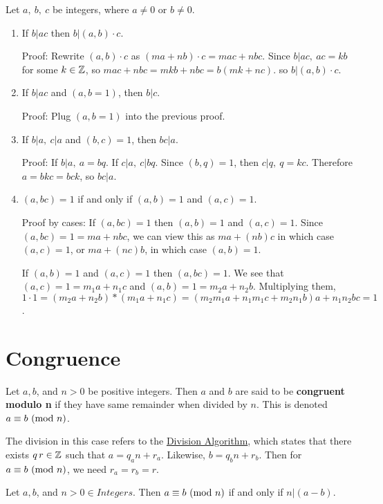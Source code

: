  Let \(a,\ b,\ c\) be integers, where \(a \neq 0\) or \(b \neq 0\).
\begin{enumerate}
    \item If \(b|ac\) then \(b|(a,b) \cdot c\).

          Proof: Rewrite \((a,b) \cdot c\) as \((ma + nb) \cdot c = mac + nbc\). Since \(b|ac,\ ac = kb\) for some \(k \in \mathbb{Z}\), so \(mac + nbc = mkb + nbc = b(mk + nc)\). so \(b|(a,b) \cdot c\).
    \item If \(b|ac\) and \((a,b = 1)\), then \(b|c\).

          Proof: Plug \((a,b = 1)\) into the previous proof.
    \item If \(b|a,\ c|a\) and \((b, c) = 1\), then \(bc|a\).

          Proof: If \(b|a,\ a = bq\). If \(c|a,\ c|bq\). Since \((b, q) = 1\), then \(c|q,\ q = kc\). Therefore \(a = bkc = bck\), so \(bc | a\).
    \item \((a,bc) = 1\) if and only if \((a,b) = 1\) and \((a,c) = 1\).

          Proof by cases: If \((a,bc) = 1\) then \((a,b) = 1\) and \((a,c) = 1\). Since \((a,bc) = 1 = ma + nbc\), we can view this as \(ma + (nb) c\) in which case \((a,c) = 1\), or \(ma + (nc)b\), in which case \((a,b) = 1\).

          If  \((a,b) = 1\) and \((a,c) = 1\) then \((a,bc) = 1\). We see that \((a,c) = 1 = m_1a + n_1c\) and \((a,b) = 1 = m_2a + n_2b\). Multiplying them, \(1\cdot 1 = (m_2a + n_2b) * (m_1a + n_1c) = (m_2m_1a + n_1m_1c + m_2n_1b)a + n_1n_2bc = 1\).
\end{enumerate}

\section{Congruence}

 Let \(a, b\), and \(n > 0\) be positive integers. Then \(a\) and \(b\) are said to be \textbf{congruent modulo n} if they have same remainder when divided by \(n\). This is denoted \({a}\equiv{b}\text{ (mod } {n}\text{)}\).

The division in this case refers to the \hyperref[def:1.1.3]{Division Algorithm}, which  states that there exists \(q\, r \in \mathbb{Z}\) such that \(a = q_{a}n + r_a\). Likewise, \(b = q_{b}n + r_b\). Then for \({a}\equiv{b}\text{ (mod } {n}\text{)}\), we need \(r_a = r_b = r\).

 Let \(a, b\), and \(n > 0 \in Integers\). Then \({a}\equiv{b}\text{ (mod } {n}\text{)}\) if and only if \(n | (a -b)\).

